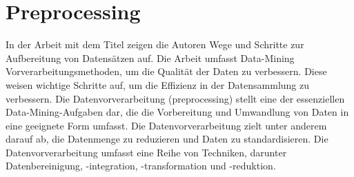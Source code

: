 
\section{Preprocessing}
In der Arbeit mit dem Titel \cite{alasadi2017review} zeigen die Autoren \citeauthor{alasadi2017review} Wege und Schritte zur Aufbereitung von Datensätzen auf. Die Arbeit umfasst Data-Mining Vorverarbeitungsmethoden, um die Qualität der Daten zu verbessern. Diese weisen wichtige Schritte auf, um die Effizienz in der Datensammlung zu verbessern. Die Datenvorverarbeitung (preprocessing) stellt eine der essenziellen Data-Mining-Aufgaben dar, die die Vorbereitung und Umwandlung von Daten in eine geeignete Form umfasst. Die Datenvorverarbeitung zielt unter anderem darauf ab, die Datenmenge zu reduzieren und Daten zu standardisieren. Die Datenvorverarbeitung umfasst eine Reihe von Techniken, darunter Datenbereinigung, -integration, -transformation und -reduktion. \\

